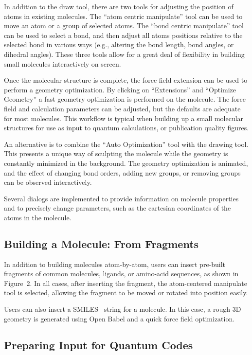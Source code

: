 \documentclass[10pt]{bmc_article}
\newenvironment{bmcformat}{\begin{raggedright}
  \baselineskip20pt\sloppy\setboolean{publ}{false}}{\end{raggedright}
  \baselineskip20pt\sloppy}
\begin{document}
\begin{bmcformat}
In addition to the draw tool, there are two tools for adjusting the position of
atoms in existing molecules. The ``atom centric manipulate'' tool can be used to
move an atom or a group of selected atoms. The ``bond centric manipulate'' tool
can
be used to select a bond, and then adjust all atoms positions relative to the
selected bond in various ways (e.g., altering the bond length, bond
angles, or dihedral angles). These three tools allow for a great deal of
flexibility in building small molecules interactively on screen.

Once the molecular structure is complete, the force field extension can be used to
perform a geometry optimization. By clicking on ``Extensions'' and ``Optimize
Geometry'' a fast geometry optimization is performed on the molecule. The
force field and calculation parameters can be adjusted, but the defaults are
adequate for most molecules. This workflow is typical when building up a small
molecular structures for use as input to quantum calculations, or publication
quality figures.

An alternative is to combine the ``Auto Optimization'' tool with the drawing
tool. This presents a unique way of sculpting the molecule while the geometry is
constantly minimized in the background. The geometry optimization is animated,
and the effect of changing bond orders, adding new groups, or removing groups can
be observed interactively.

Several dialogs are implemented to provide information on molecule properties
and to precisely change parameters, such as the cartesian coordinates of the atoms
in the molecule.

\subsection*{Building a Molecule: From Fragments}

In addition to building molecules atom-by-atom, users can insert
pre-built fragments of common molecules, ligands, or amino-acid
sequences, as shown in Figure~2.
In all cases, after inserting the fragment, the atom-centered manipulate tool
is selected, allowing the fragment to be moved or rotated into
position easily.

Users can also insert a SMILES~\cite{smiles,opensmiles} string for a molecule. In
this case, a rough 3D geometry is generated using Open Babel and a
quick force field optimization.

\subsection*{Preparing Input for Quantum Codes}


\end{bmcformat}
\end{document}
